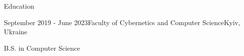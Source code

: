 \documentclass[11pt]{resume}
\begin{document}
    \begin{rSection}{Education}
        \begin{rSubsection}
            {\href{http://csc.knu.ua/en/}{\color{blue}\underline{}}}{September 2019 - June 2023}{Faculty of Cybernetics and Computer Science}{Kyiv, Ukraine}
            
            \item B.S. in Computer Science
        \end{rSubsection}
    \end{rSection}
\end{document}
